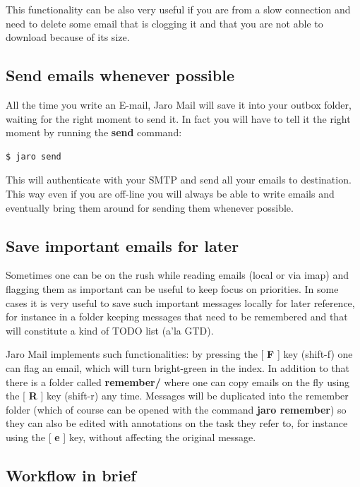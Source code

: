 \documentclass[a4,onecolumn,portrait]{article}
\begin{document}
This functionality can be also very useful if you are from a slow
connection and need to delete some email that is clogging it and that
you are not able to download because of its size.

\subsection{Send emails whenever possible}
\label{sec-6-5}

All the time you write an E-mail, Jaro Mail will save it into your
outbox folder, waiting for the right moment to send it. In fact you
will have to tell it the right moment by running the \textbf{send} command:

\begin{verbatim}
$ jaro send
\end{verbatim}

This will authenticate with your SMTP and send all your emails to
destination. This way even if you are off-line you will always be able
to write emails and eventually bring them around for sending them
whenever possible.
\subsection{Save important emails for later}
\label{sec-6-6}

Sometimes one can be on the rush while reading emails (local or via
imap) and flagging them as important can be useful to keep focus on
priorities. In some cases it is very useful to save such important
messages locally for later reference, for instance in a folder keeping
messages that need to be remembered and that will constitute a kind of
TODO list (a'la GTD).

Jaro Mail implements such functionalities: by pressing the [ \textbf{F} ] key
(shift-f) one can flag an email, which will turn bright-green in the
index. In addition to that there is a folder called \textbf{remember/} where
one can copy emails on the fly using the [ \textbf{R} ] key (shift-r) any
time. Messages will be duplicated into the remember folder (which of
course can be opened with the command \textbf{jaro remember}) so they can
also be edited with annotations on the task they refer to, for
instance using the [ \textbf{e} ] key, without affecting the original
message.
\subsection{Workflow in brief}
\label{sec-6-7}
\end{document}
